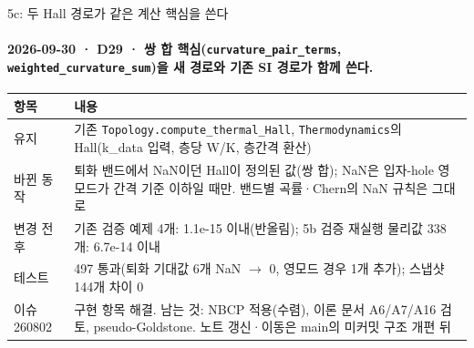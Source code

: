 \begin{frame}[label=stage5c]{5c: 두 Hall 경로가 같은 계산 핵심을 쓴다}
  \framesubtitle{2026-09-30 · D29 · 쌍 합 핵심(\texttt{curvature\_pair\_terms}, \texttt{weighted\_curvature\_sum})을 새 경로와 기존 SI 경로가 함께 쓴다.}
  \footnotesize\renewcommand{\arraystretch}{1.08}
  \begin{tabularx}{\textwidth}{@{}P{3.2cm}Y@{}}
    \toprule
    항목 & 내용 \\
    \midrule
    유지 & 기존 \texttt{Topology.compute\_thermal\_Hall}, \texttt{Thermodynamics}의 Hall(k\_data 입력, 층당 W/K, 층간격 환산) \\
    바뀐 동작 & 퇴화 밴드에서 NaN이던 Hall이 정의된 값(쌍 합); NaN은 입자-hole 영모드가 간격 기준 이하일 때만. 밴드별 곡률·Chern의 NaN 규칙은 그대로 \\
    변경 전후 & 기존 검증 예제 4개: 1.1e-15 이내(반올림); 5b 검증 재실행 물리값 338개: 6.7e-14 이내 \\
    테스트 & 497 통과(퇴화 기대값 6개 NaN $\to$ 0, 영모드 경우 1개 추가); 스냅샷 144개 차이 0 \\
    이슈 260802 & 구현 항목 해결. 남는 것: NBCP 적용(수렴), 이론 문서 A6/A7/A16 검토, pseudo-Goldstone. 노트 갱신·이동은 main의 미커밋 구조 개편 뒤 \\
    \bottomrule
  \end{tabularx}
  \par\smallskip
\end{frame}

